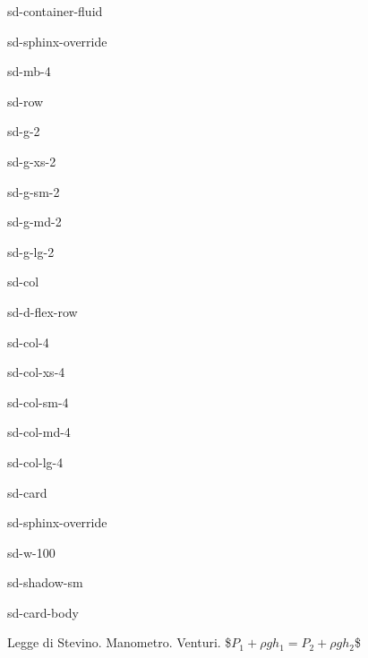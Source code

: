 \documentclass[letterpaper,10pt,italian]{jupyterBook}
\begin{document}
\begin{sphinxuseclass}{sd-container-fluid}
\begin{sphinxuseclass}{sd-sphinx-override}
\begin{sphinxuseclass}{sd-mb-4}
\begin{sphinxuseclass}{sd-row}
\begin{sphinxuseclass}{sd-g-2}
\begin{sphinxuseclass}{sd-g-xs-2}
\begin{sphinxuseclass}{sd-g-sm-2}
\begin{sphinxuseclass}{sd-g-md-2}
\begin{sphinxuseclass}{sd-g-lg-2}
\begin{sphinxuseclass}{sd-col}
\begin{sphinxuseclass}{sd-d-flex-row}
\begin{sphinxuseclass}{sd-col-4}
\begin{sphinxuseclass}{sd-col-xs-4}
\begin{sphinxuseclass}{sd-col-sm-4}
\begin{sphinxuseclass}{sd-col-md-4}
\begin{sphinxuseclass}{sd-col-lg-4}
\begin{sphinxuseclass}{sd-card}
\begin{sphinxuseclass}{sd-sphinx-override}
\begin{sphinxuseclass}{sd-w-100}
\begin{sphinxuseclass}{sd-shadow-sm}
\begin{sphinxuseclass}{sd-card-body}
\end{sphinxuseclass}
\end{sphinxuseclass}
\end{sphinxuseclass}
\end{sphinxuseclass}
\end{sphinxuseclass}
\end{sphinxuseclass}
\end{sphinxuseclass}
\end{sphinxuseclass}
\end{sphinxuseclass}
\end{sphinxuseclass}
\end{sphinxuseclass}
\end{sphinxuseclass}
\end{sphinxuseclass}
\end{sphinxuseclass}
\end{sphinxuseclass}
\end{sphinxuseclass}
\end{sphinxuseclass}
\end{sphinxuseclass}
\end{sphinxuseclass}
\end{sphinxuseclass}
\end{sphinxuseclass}
\sphinxAtStartPar
{} Legge di Stevino. Manometro. Venturi.
\$\(P_1 + \rho g h_1 = P_2 + \rho g h_2\)\$
\end{document}
